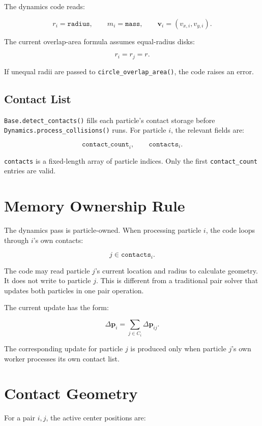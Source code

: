 \documentclass[11pt]{article}
\begin{document}
The dynamics code reads:

\[
    r_i = \texttt{radius},
    \qquad
    m_i = \texttt{mass},
    \qquad
    \mathbf{v}_i = (v_{x,i},v_{y,i}).
\]

The current overlap-area formula assumes equal-radius disks:

\[
    r_i = r_j = r.
\]

If unequal radii are passed to \texttt{circle\_overlap\_area()}, the code raises
an error.

\subsection{Contact List}

\texttt{Base.detect\_contacts()} fills each particle's contact storage before
\texttt{Dynamics.process\_collisions()} runs. For particle \(i\), the relevant
fields are:

\[
    \texttt{contact\_count}_i,
    \qquad
    \texttt{contacts}_i.
\]

\texttt{contacts} is a fixed-length array of particle indices. Only the first
\texttt{contact\_count} entries are valid.

\section{Memory Ownership Rule}

The dynamics pass is particle-owned. When processing particle \(i\), the code
loops through \(i\)'s own contacts:

\[
    j \in \texttt{contacts}_i.
\]

The code may read particle \(j\)'s current location and radius to calculate
geometry. It does not write to particle \(j\). This is different from a
traditional pair solver that updates both particles in one pair operation.

The current update has the form:

\[
    \Delta \mathbf{p}_i
    =
    \sum_{j \in C_i}
    \Delta \mathbf{p}_{ij}.
\]

The corresponding update for particle \(j\) is produced only when particle
\(j\)'s own worker processes its own contact list.

\section{Contact Geometry}

For a pair \(i,j\), the active center positions are:
\end{document}
